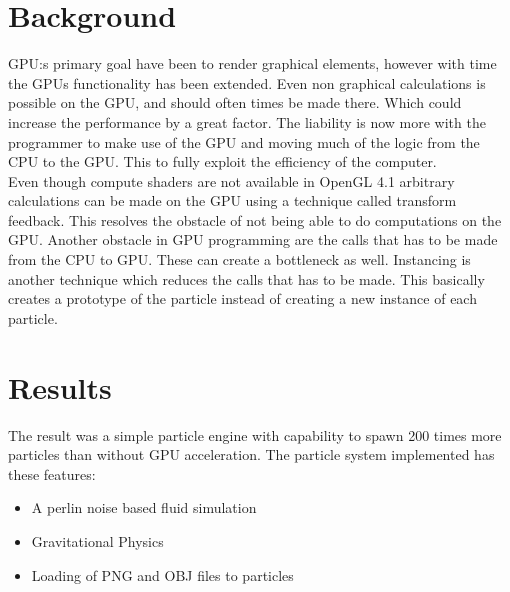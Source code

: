 \documentclass[report]{vgtc}
\begin{document}
\section{Background}
GPU:s primary goal have been to render graphical elements, however with time the GPUs functionality has been extended. Even non graphical calculations is possible on the GPU, and should often times be made there. Which could increase the performance by a great factor. The liability is now more with the programmer to make use of the GPU and moving much of the logic from the CPU to the GPU. This to fully exploit the efficiency of the computer.
\\
Even though compute shaders are not available in OpenGL 4.1 arbitrary calculations can be made on the GPU using a technique called transform feedback. This resolves the obstacle of not being able to do computations on the GPU. Another obstacle in GPU programming are the calls that has to be made from the CPU to GPU. These can create a bottleneck as well. Instancing is another technique which reduces the calls that has to be made. This basically creates a prototype of the particle instead of creating a new instance of each particle.

\section{Results}

The result was a simple particle engine with capability to spawn 200 times more particles than without GPU acceleration. The particle system implemented has these features:

\begin{itemize}
  \item A perlin noise based fluid simulation
  \item Gravitational Physics
  \item Loading of PNG and OBJ files to particles
\end{itemize}
\end{document}
